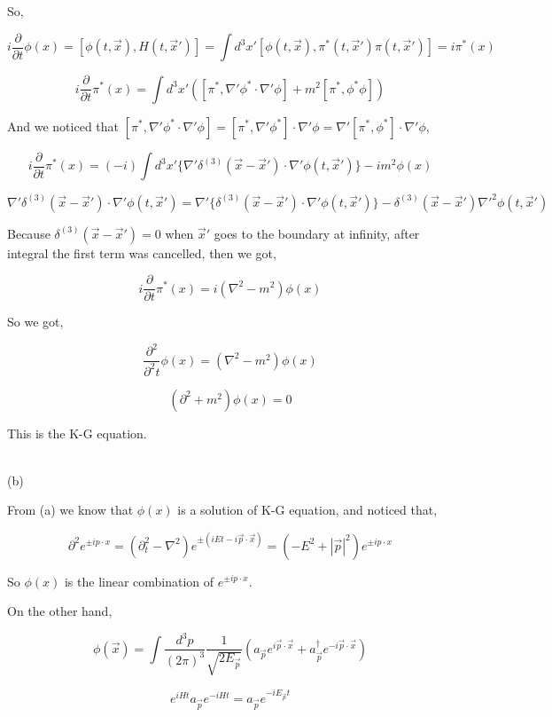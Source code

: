 \documentclass[11pt]{article} %
\begin{document}
So,

\[
    i \frac{\partial}{\partial t} \phi(x) = [\phi(t, \vec{x}), H(t, \vec{x}')] = \int d^3 x' [\phi(t, \vec{x}), \pi^*(t, \vec{x}')\pi(t, \vec{x}')] = i \pi^*(x)
\]

\[
    i \frac{\partial}{\partial t} \pi^*(x) = \int d^3 x' ([\pi^*, \nabla' \phi^* \cdot \nabla' \phi] + m^2 [\pi^*, \phi^* \phi])    
\]

And we noticed that $[\pi^*, \nabla' \phi^* \cdot \nabla' \phi] = [\pi^*, \nabla' \phi^*] \cdot \nabla' \phi = \nabla' [\pi^*, \phi^*] \cdot \nabla' \phi$,

\[
    i \frac{\partial}{\partial t} \pi^*(x) = (-i) \int d^3 x' \{ \nabla' \delta^{(3)}(\vec{x} - \vec{x}') \cdot \nabla' \phi(t, \vec{x}') \} - i m^2 \phi(x)
\]

\[
    \nabla' \delta^{(3)}(\vec{x} - \vec{x}') \cdot \nabla' \phi(t, \vec{x}') = \nabla' \{ \delta^{(3)}(\vec{x} - \vec{x}') \cdot \nabla' \phi(t, \vec{x}') \} - \delta^{(3)}(\vec{x} - \vec{x}') \nabla'^2 \phi(t, \vec{x}')
\]

Because $\delta^{(3)}(\vec{x} - \vec{x}') = 0$ when $\vec{x}'$ goes to the boundary at infinity, after integral the first term was cancelled, then we got,

\[
    i \frac{\partial}{\partial t} \pi^*(x) = i (\nabla^2 - m^2) \phi(x)
\]

So we got,

\[
    \frac{\partial^2}{\partial^2 t} \phi(x) = (\nabla^2 - m^2) \phi(x)   
\]

\[
    (\partial^2 + m^2) \phi(x) = 0  
\]

This is the K-G equation.

~\\

\noindent (b)

From (a) we know that $\phi(x)$ is a solution of K-G equation, and noticed that,

\[
    \partial^2 e^{\pm i p \cdot x} = (\partial_t^2 - \nabla^2) e^{\pm (iEt - i \vec{p}\cdot \vec{x})} = (-E^2 + |\vec{p}|^2) e^{\pm i p \cdot x}
\]

So $\phi(x)$ is the linear combination of $e^{\pm i p \cdot x}$.

On the other hand, 

\[
    \phi(\vec{x})=\int \frac{d^{3} p}{(2 \pi)^{3}} \frac{1}{\sqrt{2 E_{\vec{p}}}} (a_{\vec{p}} e^{i \vec{p} \cdot \vec{x}}+a_{\vec{p}}^{\dagger} e^{-i \vec{p} \cdot \vec{x}})    
\]

\[
    e^{i H t} a_{\vec{p}} e^{-i H t}=a_{\vec{p}} e^{-i E_{\vec{p}} t}    
\]
\end{document}
